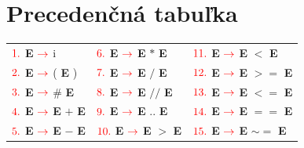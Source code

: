 \documentclass[a4paper, 11pt]{article}
\newcommand{\arrow} {$\color{red} \rightarrow$\space}
\begin{document}
    \section*{Precedenčná tabuľka}
    \newcommand{\bE}{\textbf{E}}
    \begin{table}[!htbp]
        \centering
        \begin{tabular}{l@{\hskip 1in} l@{\hskip 1in} l}
            $\color{red} 1.$ \bE{} \space\arrow{} i               & $\color{red} 6.$  \bE{} \space\arrow{} \bE{} $*$ \bE{}  & $\color{red} 11.$ \bE{} \space\arrow{} \bE{} $<$ \bE{}     \\
            $\color{red} 2.$ \bE{} \space\arrow{} ( \bE{} )         & $\color{red} 7.$  \bE{} \space\arrow{} \bE{} $/$ \bE{}  & $\color{red} 12.$ \bE{} \space\arrow{} \bE{} $>=$ \bE{}    \\
            $\color{red} 3.$ \bE{} \space\arrow{} \# \bE{}         & $\color{red} 8.$  \bE{} \space\arrow{} \bE{} $//$ \bE{} & $\color{red} 13.$ \bE{} \space\arrow{} \bE{} $<=$ \bE{}    \\
            $\color{red} 4.$ \bE{} \space\arrow{} \bE{} $+$ \bE{} & $\color{red} 9.$  \bE{} \space\arrow{} \bE{} .. \bE{}   & $\color{red} 14.$ \bE{} \space\arrow{} \bE{} $==$ \bE{}    \\
            $\color{red} 5.$ \bE{} \space\arrow{} \bE{} $-$ \bE{} & $\color{red} 10.$ \bE{} \space\arrow{} \bE{} $>$ \bE{}  & $\color{red} 15.$ \bE{} \space\arrow{} \bE{} $\sim=$ \bE{} \\
        \end{tabular}
    \end{table}
\end{document}
